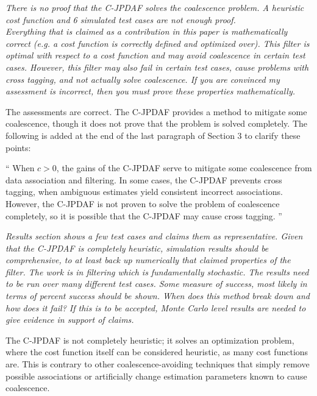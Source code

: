\documentclass[11pt]{article}
\newenvironment{correction}{\begin{list}{}{\setlength{\leftmargin}{1cm}\setlength{\rightmargin}{1cm}}\vspace{\parsep}\item[]``}{''\end{list}}
\begin{document}
\begin{itemize}
\item {\itshape There is no proof that the C-JPDAF solves the coalescence problem.  A heuristic cost function and 6 simulated test cases are not enough proof.
\\
Everything that is claimed as a contribution in this paper is mathematically correct (e.g. a cost function is correctly defined and optimized over). This filter is optimal with respect to a cost function and may avoid coalescence in certain test cases.  However, this filter may also fail in certain test cases, cause problems with cross tagging, and not actually solve coalescence.  If you are convinced my assessment is incorrect, then you must prove these properties mathematically.}

The assessments are correct. The C-JPDAF provides a method to mitigate some coalescence, though it does not prove that the problem is solved completely. The following is added at the end of the last paragraph of Section 3 to clarify these points:

\begin{correction}
When $c>0$, the gains of the C-JPDAF serve to mitigate some coalescence from data association and filtering. In some cases, the C-JPDAF prevents cross tagging, when ambiguous estimates yield consistent incorrect associations. However, the C-JPDAF is not proven to solve the problem of coalescence completely, so it is possible that the C-JPDAF may cause cross tagging.
\end{correction}


\item {\itshape Results section shows a few test cases and claims them as representative.  Given that the C-JPDAF is completely heuristic, simulation results should be comprehensive, to at least back up numerically that claimed properties of the filter. The work is in filtering which is fundamentally stochastic.  The results need to be run over many different test cases.  Some measure of success, most likely in terms of percent success should be shown.  When does this method break down and how does it fail? If this is to be accepted, Monte Carlo level results are needed to give evidence in support of claims.}

The C-JPDAF is not completely heuristic; it solves an optimization problem, where the cost function itself can be considered heuristic, as many cost functions are. This is contrary to other coalescence-avoiding techniques that simply remove possible associations or artificially change estimation parameters known to cause coalescence.


\end{itemize}
\end{document}
